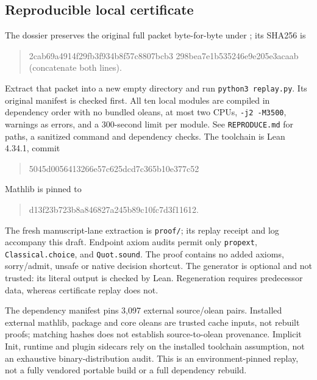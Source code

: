 \documentclass[11pt]{article}
\begin{document}
\subsection*{Reproducible local certificate}
The dossier preserves the original full packet byte-for-byte under
; its SHA256 is
\begin{quote}\small\ttfamily
2cab69a4914f29fb3f934b8f57c8807bcb3\newline
298bea7e1b535246e9e205e3acaab (concatenate both lines).
\end{quote}
Extract that packet into a new empty directory and run \texttt{python3 replay.py}. Its original manifest is checked first. All ten local modules are compiled in dependency order with no bundled oleans, at most two CPUs, \texttt{-j2 -M3500}, warnings as errors, and a 300-second limit per module. See \texttt{REPRODUCE.md} for paths, a sanitized command and dependency checks. The toolchain is Lean 4.34.1, commit
\begin{quote}\small\ttfamily
5045d0056413266e57c625dcd7c365b10e377c52
\end{quote}
Mathlib is pinned to
\begin{quote}\small\ttfamily
d13f23b723b8a846827a245b89c10fc7d3f11612.
\end{quote}

The fresh manuscript-lane extraction is \texttt{proof/}; its replay receipt and log accompany this draft. Endpoint axiom audits permit only \texttt{propext}, \texttt{Classical.choice}, and \texttt{Quot.sound}. The proof contains no added axioms, sorry/admit, unsafe or native decision shortcut. The generator is optional and not trusted: its literal output is checked by Lean. Regeneration requires predecessor data, whereas certificate replay does not.

The dependency manifest pins 3,097 external source/olean pairs. Installed external mathlib, package and core oleans are trusted cache inputs, not rebuilt proofs; matching hashes does not establish source-to-olean provenance. Implicit Init, runtime and plugin sidecars rely on the installed toolchain assumption, not an exhaustive binary-distribution audit. This is an environment-pinned replay, not a fully vendored portable build or a full dependency rebuild.
\end{document}
